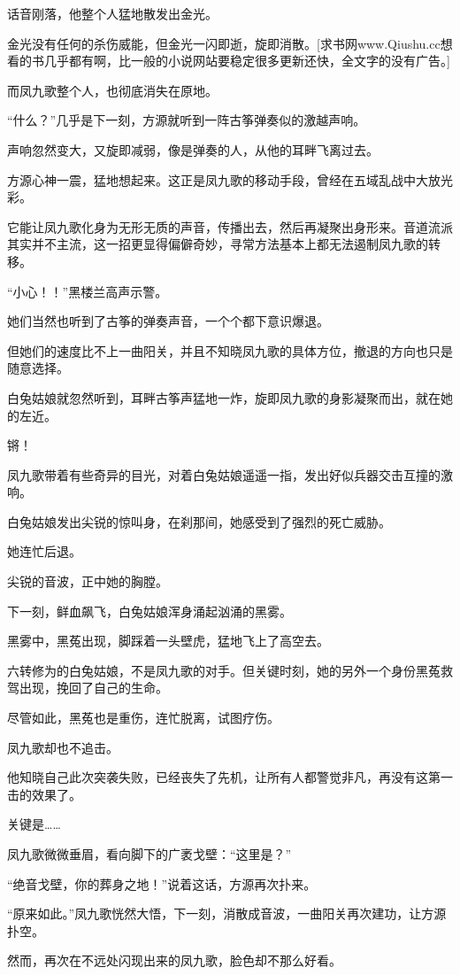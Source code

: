 \begin{this_body}
话音刚落，他整个人猛地散发出金光。

金光没有任何的杀伤威能，但金光一闪即逝，旋即消散。[求书网www.Qiushu.cc想看的书几乎都有啊，比一般的小说网站要稳定很多更新还快，全文字的没有广告。]

而凤九歌整个人，也彻底消失在原地。

“什么？”几乎是下一刻，方源就听到一阵古筝弹奏似的激越声响。

声响忽然变大，又旋即减弱，像是弹奏的人，从他的耳畔飞离过去。

方源心神一震，猛地想起来。这正是凤九歌的移动手段，曾经在五域乱战中大放光彩。

它能让凤九歌化身为无形无质的声音，传播出去，然后再凝聚出身形来。音道流派其实并不主流，这一招更显得偏僻奇妙，寻常方法基本上都无法遏制凤九歌的转移。

“小心！！”黑楼兰高声示警。

她们当然也听到了古筝的弹奏声音，一个个都下意识爆退。

但她们的速度比不上一曲阳关，并且不知晓凤九歌的具体方位，撤退的方向也只是随意选择。

白兔姑娘就忽然听到，耳畔古筝声猛地一炸，旋即凤九歌的身影凝聚而出，就在她的左近。

锵！

凤九歌带着有些奇异的目光，对着白兔姑娘遥遥一指，发出好似兵器交击互撞的激响。

白兔姑娘发出尖锐的惊叫身，在刹那间，她感受到了强烈的死亡威胁。

她连忙后退。

尖锐的音波，正中她的胸膛。

下一刻，鲜血飙飞，白兔姑娘浑身涌起汹涌的黑雾。

黑雾中，黑菟出现，脚踩着一头壁虎，猛地飞上了高空去。

六转修为的白兔姑娘，不是凤九歌的对手。但关键时刻，她的另外一个身份黑菟救驾出现，挽回了自己的生命。

尽管如此，黑菟也是重伤，连忙脱离，试图疗伤。

凤九歌却也不追击。

他知晓自己此次突袭失败，已经丧失了先机，让所有人都警觉非凡，再没有这第一击的效果了。

关键是……

凤九歌微微垂眉，看向脚下的广袤戈壁：“这里是？”

“绝音戈壁，你的葬身之地！”说着这话，方源再次扑来。

“原来如此。”凤九歌恍然大悟，下一刻，消散成音波，一曲阳关再次建功，让方源扑空。

然而，再次在不远处闪现出来的凤九歌，脸色却不那么好看。


\end{this_body}
